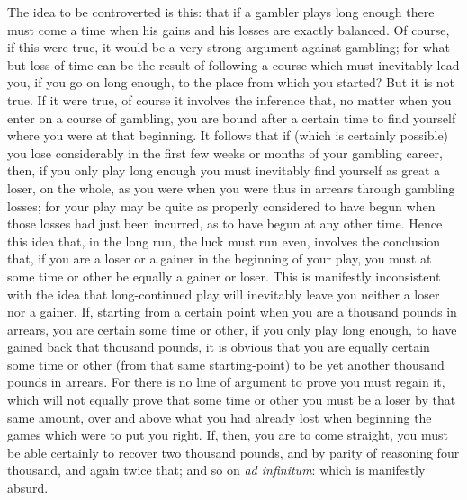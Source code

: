 \documentclass[letterpaper,12pt,oneside,openany]{memoir}
\begin{document}
The idea to be controverted is this: that if a gambler
plays long enough there must come a time when
his gains and his losses are exactly balanced. Of
course, if this were true, it would be a very strong
argument against gambling; for what but loss of time
can be the result of following a course which must
inevitably lead you, if you go on long enough, to the
place from which you started? But it is not true. If
it were true, of course it involves the inference that, no
matter when you enter on a course of gambling, you
are bound after a certain time to find yourself where
you were at that beginning. It follows that if (which
is certainly possible) you lose considerably in the first
few weeks or months of your gambling career, then, if
you only play long enough you must inevitably find
yourself as great a loser, on the whole, as you were when
you were thus in arrears through gambling losses; for
your play may be quite as properly considered to have
begun when those losses had just been incurred, as to
have begun at any other time. Hence this idea that,
in the long run, the luck must run even, involves the
conclusion that, if you are a loser or a gainer in the
beginning of your play, you must at some time or other
be equally a gainer or loser. This is manifestly inconsistent
with the idea that long-continued play will
inevitably leave you neither a loser nor a gainer. If,
starting from a certain point when you are a thousand
pounds in arrears, you are certain some time or other,
if you only play long enough, to have gained back that
thousand pounds, it is obvious that you are equally
certain some time or other (from that same starting-point)
to be yet another thousand pounds in arrears.
For there is no line of argument to prove you must
regain it, which will not equally prove that some time
or other you must be a loser by that same amount, over
and above what you had already lost when beginning
the games which were to put you right. If, then, you
are to come straight, you must be able certainly to
recover two thousand pounds, and by parity of reasoning
four thousand, and again twice that; and so on 
\textit{ad infinitum}: which is manifestly absurd.
\end{document}
